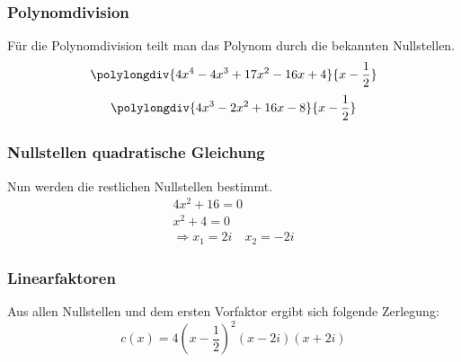 \documentclass[18pt,4paper]{article}
\begin{document}
\subsubsection*{Polynomdivision}
Für die Polynomdivision teilt man das Polynom durch die bekannten Nullstellen.
\[\polylongdiv{4x^4-4x^3+17x^2-16x+4}{x-\frac{1}{2}}\]
\hfill
\[\polylongdiv{4x^3-2x^2+16x-8}{x-\frac{1}{2}}\]

\subsubsection*{Nullstellen quadratische Gleichung}
Nun werden die restlichen Nullstellen bestimmt.
\begin{align*}
	4x^2+16=0\\
	x^2+4=0\\
	\Rightarrow x_1 = 2i\quad x_2=-2i
\end{align*}
\subsubsection*{Linearfaktoren}
Aus allen Nullstellen und dem ersten Vorfaktor ergibt sich folgende Zerlegung:
\begin{equation*}
	c(x)=4(x-\frac{1}{2})^2(x-2i)(x+2i)
\end{equation*}
\end{document}
